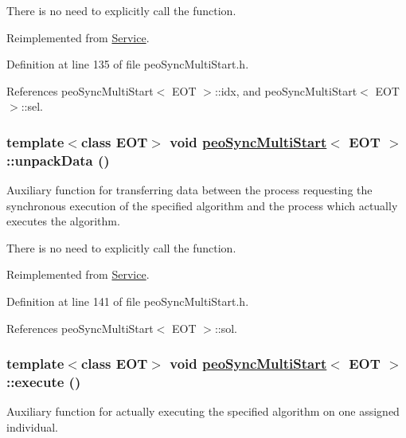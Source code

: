 There is no need to explicitly call the function. 

Reimplemented from \hyperlink{classService_aea4b8f7f8fb88e83862ee4bfd9ab207}{Service}.

Definition at line 135 of file peo\-Sync\-Multi\-Start.h.

References peo\-Sync\-Multi\-Start$<$ EOT $>$::idx, and peo\-Sync\-Multi\-Start$<$ EOT $>$::sel.\hypertarget{classpeoSyncMultiStart_2903a441b77cded266b5fb651e17a5b5}{
\subsubsection[unpackData]{\setlength{\rightskip}{0pt plus 5cm}template$<$class EOT$>$ void \hyperlink{classpeoSyncMultiStart}{peo\-Sync\-Multi\-Start}$<$ EOT $>$::unpack\-Data ()}}
\label{classpeoSyncMultiStart_2903a441b77cded266b5fb651e17a5b5}


Auxiliary function for transferring data between the process requesting the synchronous execution of the specified algorithm and the process which actually executes the algorithm. 

There is no need to explicitly call the function. 

Reimplemented from \hyperlink{classService_3bd87b444710813d30fd754d4d0b4df3}{Service}.

Definition at line 141 of file peo\-Sync\-Multi\-Start.h.

References peo\-Sync\-Multi\-Start$<$ EOT $>$::sol.\hypertarget{classpeoSyncMultiStart_a4d1c2943c290de540800087b54dc49b}{
\subsubsection[execute]{\setlength{\rightskip}{0pt plus 5cm}template$<$class EOT$>$ void \hyperlink{classpeoSyncMultiStart}{peo\-Sync\-Multi\-Start}$<$ EOT $>$::execute ()}}
\label{classpeoSyncMultiStart_a4d1c2943c290de540800087b54dc49b}


Auxiliary function for actually executing the specified algorithm on one assigned individual. 

